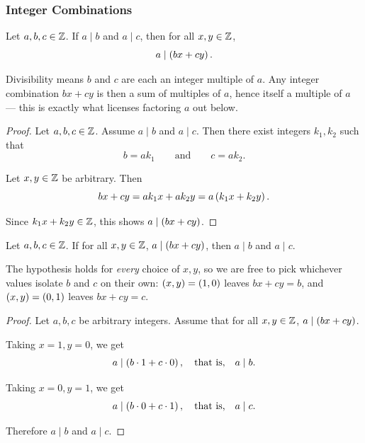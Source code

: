 \subsubsection{Integer Combinations}
\begin{proposition}
    Let $a, b, c \in \mathbb{Z}$. If $a \mid b$ and $a \mid c$, then for all $x, y \in \mathbb{Z}$,
    \begin{equation*}
        a \mid \left(bx + cy\right).
    \end{equation*}
\end{proposition}
\begin{remark}
    Divisibility means $b$ and $c$ are each an integer multiple of $a$. Any integer
    combination $bx + cy$ is then a sum of multiples of $a$, hence itself a multiple of
    $a$ — this is exactly what licenses factoring $a$ out below.
\end{remark}
\begin{proof}
    Let $a, b, c \in \mathbb{Z}$. Assume $a \mid b$ and $a \mid c$. Then there exist integers
    $k_1, k_2$ such that
    \begin{equation*}
        b = ak_1 \qquad \text{and} \qquad c = ak_2.
    \end{equation*}

    Let $x, y \in \mathbb{Z}$ be arbitrary. Then
    \begin{equation*}
        bx + cy = ak_1x + ak_2y = a\left(k_1x + k_2y\right).
    \end{equation*}

    Since $k_1x + k_2y \in \mathbb{Z}$, this shows $a \mid \left(bx + cy\right)$.
\end{proof}

\begin{proposition}
    Let $a, b, c \in \mathbb{Z}$. If for all $x, y \in \mathbb{Z}$, $a \mid \left(bx + cy\right)$, then $a \mid b$
    and $a \mid c$.
\end{proposition}
\begin{remark}
    The hypothesis holds for \emph{every} choice of $x, y$, so we are free to pick whichever
    values isolate $b$ and $c$ on their own: $\left(x, y\right) = \left(1, 0\right)$ leaves $bx + cy = b$,
    and $\left(x, y\right) = \left(0, 1\right)$ leaves $bx + cy = c$.
\end{remark}
\begin{proof}
    Let $a, b, c$ be arbitrary integers. Assume that for all $x, y \in \mathbb{Z}$,
    $a \mid \left(bx + cy\right)$.

    Taking $x = 1, y = 0$, we get
    \begin{equation*}
        a \mid \left(b \cdot 1 + c \cdot 0\right), \quad \text{that is,} \quad a \mid b.
    \end{equation*}

    Taking $x = 0, y = 1$, we get
    \begin{equation*}
        a \mid \left(b \cdot 0 + c \cdot 1\right), \quad \text{that is,} \quad a \mid c.
    \end{equation*}

    Therefore $a \mid b$ and $a \mid c$.
\end{proof}

